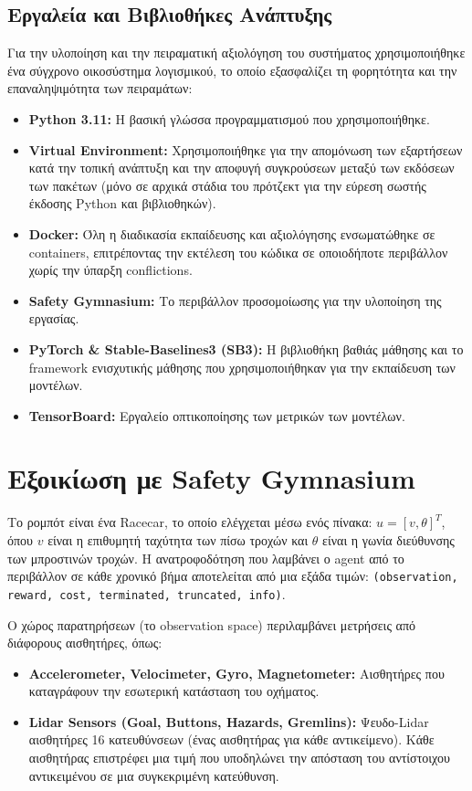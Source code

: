 \documentclass[acmsmall,screen,nonacm]{acmart}
\begin{document}
	\subsection{Εργαλεία και Βιβλιοθήκες Ανάπτυξης}
	Για την υλοποίηση και την πειραματική αξιολόγηση του συστήματος χρησιμοποιήθηκε ένα σύγχρονο οικοσύστημα λογισμικού, το οποίο εξασφαλίζει τη φορητότητα και την επαναληψιμότητα των πειραμάτων:
	\begin{itemize}
		\item \textbf{Python 3.11:} Η βασική γλώσσα προγραμματισμού που χρησιμοποιήθηκε.
		\item \textbf{Virtual Environment:} Χρησιμοποιήθηκε για την απομόνωση των εξαρτήσεων κατά την τοπική ανάπτυξη και την αποφυγή συγκρούσεων μεταξύ των εκδόσεων των πακέτων (μόνο σε αρχικά στάδια του πρότζεκτ για την εύρεση σωστής έκδοσης Python και βιβλιοθηκών).
		\item \textbf{Docker:} Όλη η διαδικασία εκπαίδευσης και αξιολόγησης ενσωματώθηκε σε containers, επιτρέποντας την εκτέλεση του κώδικα σε οποιοδήποτε περιβάλλον χωρίς την ύπαρξη conflictions. 
		\item \textbf{Safety Gymnasium:} Το περιβάλλον προσομοίωσης για την υλοποίηση της εργασίας.
		\item \textbf{PyTorch \& Stable-Baselines3 (SB3):} Η βιβλιοθήκη βαθιάς μάθησης και το framework ενισχυτικής μάθησης που χρησιμοποιήθηκαν για την εκπαίδευση των μοντέλων.
		\item \textbf{TensorBoard:} Εργαλείο οπτικοποίησης των μετρικών των μοντέλων.
	\end{itemize}

	\section{Εξοικίωση με Safety Gymnasium}
	Το ρομπότ είναι ένα Racecar, το οποίο ελέγχεται μέσω ενός πίνακα: $u = [v, \theta]^T$, όπου $v$ είναι η επιθυμητή ταχύτητα των πίσω τροχών και $\theta$ είναι η γωνία διεύθυνσης των μπροστινών τροχών.	Η ανατροφοδότηση που λαμβάνει ο agent από το περιβάλλον σε κάθε χρονικό βήμα αποτελείται από μια εξάδα τιμών: \texttt{(observation, reward, cost, terminated, truncated, info)}. 
	
	Ο χώρος παρατηρήσεων (το observation space) περιλαμβάνει μετρήσεις από διάφορους αισθητήρες, όπως:
	\begin{itemize}
		\item \textbf{Accelerometer, Velocimeter, Gyro, Magnetometer:} Αισθητήρες που καταγράφουν την εσωτερική κατάσταση του οχήματος.
		\item \textbf{Lidar Sensors (Goal, Buttons, Hazards, Gremlins):} Ψευδο-Lidar αισθητήρες 16 κατευθύνσεων (ένας αισθητήρας για κάθε αντικείμενο). Κάθε αισθητήρας επιστρέφει μια τιμή που υποδηλώνει την απόσταση του αντίστοιχου αντικειμένου σε μια συγκεκριμένη κατεύθυνση.
	\end{itemize}
	
\end{document}
